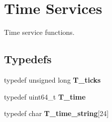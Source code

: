 \hypertarget{group__RTEMSTestFrameworkTime}{}\section{Time Services}
\label{group__RTEMSTestFrameworkTime}


Time service functions.  


\subsection*{Typedefs}
\begin{DoxyCompactItemize}
\item 
\mbox{\label{group__RTEMSTestFrameworkTime_ga3678ad10acc00e1dacb1328147797153}} 
typedef unsigned long {\bfseries T\+\_\+ticks}
\item 
\mbox{\label{group__RTEMSTestFrameworkTime_ga57383479354ebdfd76d4bdbd97f1797f}} 
typedef uint64\+\_\+t {\bfseries T\+\_\+time}
\item 
\mbox{\label{group__RTEMSTestFrameworkTime_ga49d77763edf69b0e530dd2578ddd90df}} 
typedef char {\bfseries T\+\_\+time\+\_\+string}\mbox{[}24\mbox{]}
\end{DoxyCompactItemize}
